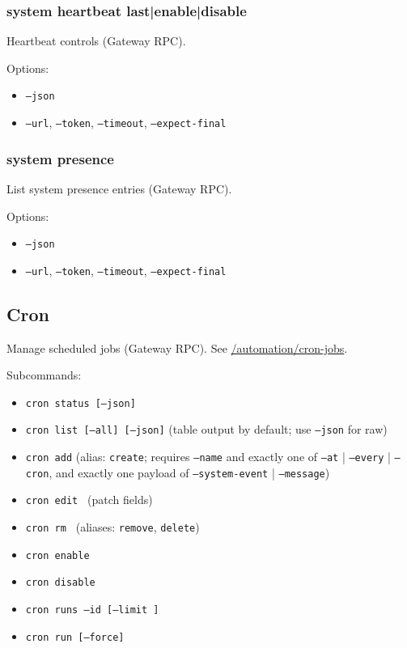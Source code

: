 \subsubsection{system heartbeat last|enable|disable}


Heartbeat controls (Gateway RPC).

Options:

\begin{itemize}
  \item \texttt{--json}
  \item \texttt{--url}, \texttt{--token}, \texttt{--timeout}, \texttt{--expect-final}
\end{itemize}


\subsubsection{system presence}


List system presence entries (Gateway RPC).

Options:

\begin{itemize}
  \item \texttt{--json}
  \item \texttt{--url}, \texttt{--token}, \texttt{--timeout}, \texttt{--expect-final}
\end{itemize}


\subsection{Cron}


Manage scheduled jobs (Gateway RPC). See \href{/automation/cron-jobs}{/automation/cron-jobs}.

Subcommands:

\begin{itemize}
  \item \texttt{cron status [--json]}
  \item \texttt{cron list [--all] [--json]} (table output by default; use \texttt{--json} for raw)
  \item \texttt{cron add} (alias: \texttt{create}; requires \texttt{--name} and exactly one of \texttt{--at} | \texttt{--every} | \texttt{--cron}, and exactly one payload of \texttt{--system-event} | \texttt{--message})
  \item \texttt{cron edit } (patch fields)
  \item \texttt{cron rm } (aliases: \texttt{remove}, \texttt{delete})
  \item \texttt{cron enable }
  \item \texttt{cron disable }
  \item \texttt{cron runs --id  [--limit ]}
  \item \texttt{cron run  [--force]}
\end{itemize}


